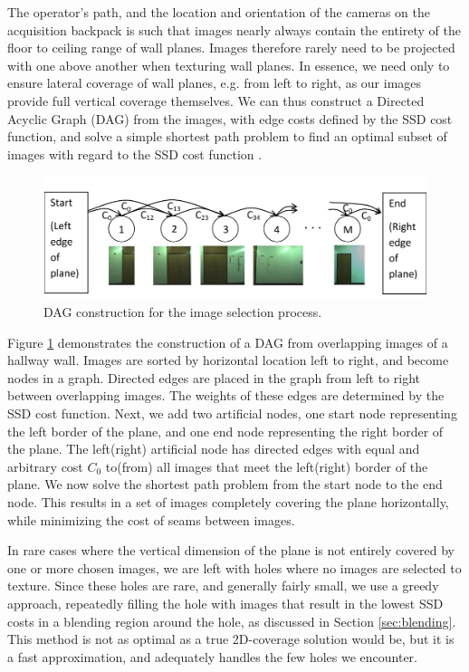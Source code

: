 \documentclass[]{spie}  %
\begin{document}
The operator's path, and the location and orientation of the cameras
on the acquisition backpack is such that images nearly always contain
the entirety of the floor to ceiling range of wall planes. Images
therefore rarely need to be projected with one above another when
texturing wall planes. In essence, we need only to ensure lateral
coverage of wall planes, e.g. from left to right, as our images
provide full vertical coverage themselves. We can thus construct a
Directed Acyclic Graph (DAG) from the images, with edge costs defined
by the SSD cost function, and solve a simple shortest path problem to
find an optimal subset of images with regard to the SSD cost function
\cite{dijkstra}.

\begin{figure}
  \centering
  \includegraphics[width=5in]{dagCreation.pdf}
  \caption{DAG construction for the image selection process. \\}
  \label{fig:dagCreation}
\end{figure}

Figure \ref{fig:dagCreation} demonstrates the construction of a DAG
from overlapping images of a hallway wall. Images are sorted by
horizontal location left to right, and become nodes in a
graph. Directed edges are placed in the graph from left to right
between overlapping images. The weights of these edges are determined
by the SSD cost function. Next, we add two artificial nodes, one start
node representing the left border of the plane, and one end node
representing the right border of the plane. The left(right) artificial
node has directed edges with equal and arbitrary cost $C_0$ to(from)
all images that meet the left(right) border of the plane. We now solve
the shortest path problem from the start node to the end node. This
results in a set of images completely covering the plane horizontally,
while minimizing the cost of seams between images.

In rare cases where the vertical dimension of the plane is not
entirely covered by one or more chosen images, we are left with holes
where no images are selected to texture. Since these holes are rare,
and generally fairly small, we use a greedy approach, repeatedly
filling the hole with images that result in the lowest SSD costs in a
blending region around the hole, as discussed in Section
\ref{sec:blending}. This method is not as optimal as a true
2D-coverage solution would be, but it is a fast approximation, and
adequately handles the few holes we encounter.
\end{document}
